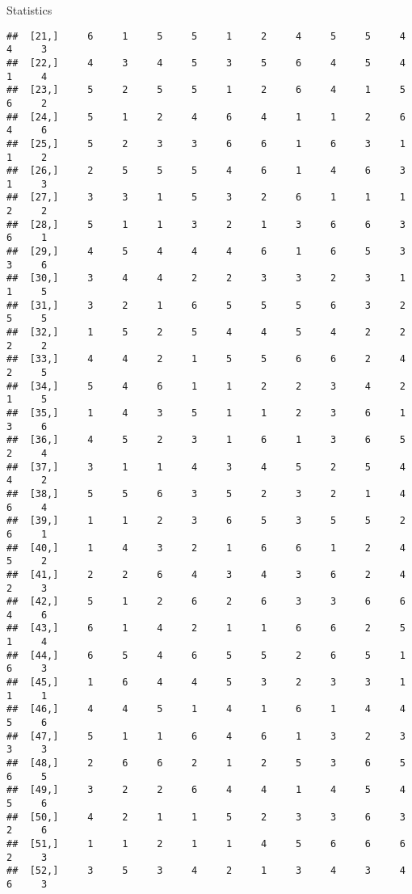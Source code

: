 \documentclass[
  ignorenonframetext,
]{beamer}
\begin{document}
\begin{frame}[fragile]{Statistics}
\begin{verbatim}
##  [21,]     6     1     5     5     1     2     4     5     5     4     4     3
##  [22,]     4     3     4     5     3     5     6     4     5     4     1     4
##  [23,]     5     2     5     5     1     2     6     4     1     5     6     2
##  [24,]     5     1     2     4     6     4     1     1     2     6     4     6
##  [25,]     5     2     3     3     6     6     1     6     3     1     1     2
##  [26,]     2     5     5     5     4     6     1     4     6     3     1     3
##  [27,]     3     3     1     5     3     2     6     1     1     1     2     2
##  [28,]     5     1     1     3     2     1     3     6     6     3     6     1
##  [29,]     4     5     4     4     4     6     1     6     5     3     3     6
##  [30,]     3     4     4     2     2     3     3     2     3     1     1     5
##  [31,]     3     2     1     6     5     5     5     6     3     2     5     5
##  [32,]     1     5     2     5     4     4     5     4     2     2     2     2
##  [33,]     4     4     2     1     5     5     6     6     2     4     2     5
##  [34,]     5     4     6     1     1     2     2     3     4     2     1     5
##  [35,]     1     4     3     5     1     1     2     3     6     1     3     6
##  [36,]     4     5     2     3     1     6     1     3     6     5     2     4
##  [37,]     3     1     1     4     3     4     5     2     5     4     4     2
##  [38,]     5     5     6     3     5     2     3     2     1     4     6     4
##  [39,]     1     1     2     3     6     5     3     5     5     2     6     1
##  [40,]     1     4     3     2     1     6     6     1     2     4     5     2
##  [41,]     2     2     6     4     3     4     3     6     2     4     2     3
##  [42,]     5     1     2     6     2     6     3     3     6     6     4     6
##  [43,]     6     1     4     2     1     1     6     6     2     5     1     4
##  [44,]     6     5     4     6     5     5     2     6     5     1     6     3
##  [45,]     1     6     4     4     5     3     2     3     3     1     1     1
##  [46,]     4     4     5     1     4     1     6     1     4     4     5     6
##  [47,]     5     1     1     6     4     6     1     3     2     3     3     3
##  [48,]     2     6     6     2     1     2     5     3     6     5     6     5
##  [49,]     3     2     2     6     4     4     1     4     5     4     5     6
##  [50,]     4     2     1     1     5     2     3     3     6     3     2     6
##  [51,]     1     1     2     1     1     4     5     6     6     6     2     3
##  [52,]     3     5     3     4     2     1     3     4     3     4     6     3

\end{verbatim}
\end{frame}
\end{document}
